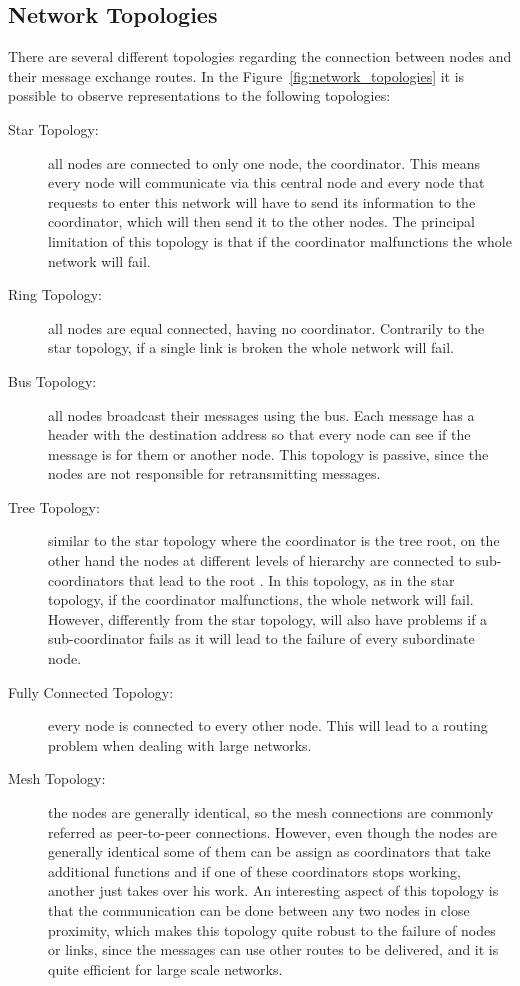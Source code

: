 \subsection{Network Topologies}
\label{subsec:network_topologies}
There are several different topologies \cite{Lewis2004, Yadav2012} regarding the connection
between nodes and their message exchange routes. In the Figure~\ref{fig:network_topologies} it
is possible to observe representations to the following topologies:
\begin{description}
      \item[Star Topology:] all nodes are connected to only one node, the coordinator. This
            means every node will communicate via this central node and every node that requests
            to enter this network will have to send its information to the coordinator, which
            will then send it to the other nodes. The principal limitation of this topology is
            that if the coordinator malfunctions the whole network will fail.
      \item[Ring Topology:] all nodes are equal connected, having no coordinator. Contrarily
            to the star topology, if a single link is broken the whole network will fail.
      \item[Bus Topology:] all nodes broadcast their messages using the bus. Each message
            has a header with the destination address so that every node can see if the message
            is for them or another node. This topology is passive, since the nodes are not
            responsible for retransmitting messages.
      \item[Tree Topology:] similar to the star topology where the coordinator is the tree root, on
            the other hand the nodes at different levels of hierarchy are connected to sub-coordinators
            that lead to the root \cite{Shrestha2007}. In this topology, as in the star topology, if
            the coordinator malfunctions, the whole network will fail. However, differently from
            the star topology, will also have problems if a sub-coordinator fails as it will lead
            to the failure of every subordinate node.
      \item[Fully Connected Topology:] every node is connected to every other node. This will
            lead to a routing problem when dealing with large networks.
      \item[Mesh Topology:] the nodes are generally identical, so the mesh connections are
            commonly referred as peer-to-peer connections. However, even though the nodes are
            generally identical some of them can be assign as coordinators that take additional
            functions and if one of these coordinators stops working, another just takes over his
            work. An interesting aspect of this topology is that the communication can be
            done between any two nodes in close proximity, which makes this topology quite
            robust to the failure of nodes or links, since the messages can use other routes to be
            delivered, and it is quite efficient for large scale networks.
\end{description}

